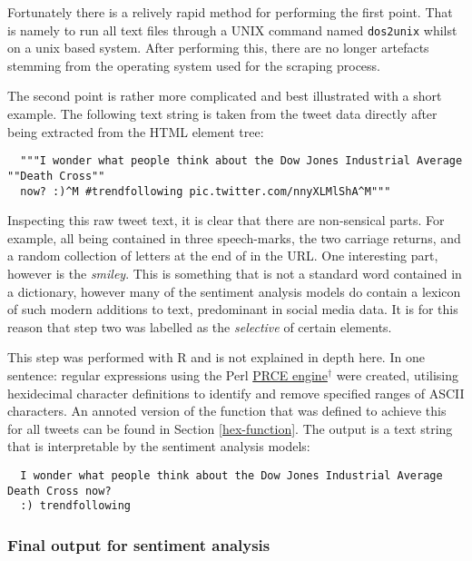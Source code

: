 \documentclass{article}
\begin{document}
Fortunately there is a relively rapid method for performing the first point. That is namely to run all text files through a UNIX command named \texttt{dos2unix} whilst on a unix based system. After performing this, there are no longer artefacts stemming from the operating system used for the scraping process.

The second point is rather more complicated and best illustrated with a short example. The following text string is taken from the tweet data directly after being extracted from the HTML element tree:

\begin{verbatim}
  """I wonder what people think about the Dow Jones Industrial Average ""Death Cross""
  now? :)^M #trendfollowing pic.twitter.com/nnyXLMlShA^M"""
\end{verbatim}

Inspecting this raw tweet text, it is clear that there are non-sensical parts. For example, all being contained in three speech-marks, the two carriage returns, and a random collection of letters at the end of in the URL. One interesting part, however is the \emph{smiley}. This is something that is not a standard word contained in a dictionary, however many of the sentiment analysis models do contain a lexicon of such modern additions to text, predominant in social media data. It is for this reason that step two was labelled as the \emph{selective} of certain elements.

This step was performed with R and is not explained in depth here. In one sentence: regular expressions using the Perl \href{http://www.pcre.org/}{PRCE engine$^{\dag{}}$} were created, utilising hexidecimal character definitions to identify and remove specified ranges of ASCII characters. An annoted version of the function that was defined to achieve this for all tweets can be found in Section \ref{hex-function}.
The output is a text string that is interpretable by the sentiment analysis models:

\begin{verbatim}
  I wonder what people think about the Dow Jones Industrial Average Death Cross now?
  :) trendfollowing
\end{verbatim}


\subsubsection{Final output for sentiment analysis \label{final-output}}
\label{sec-3-3-6}
\end{document}
